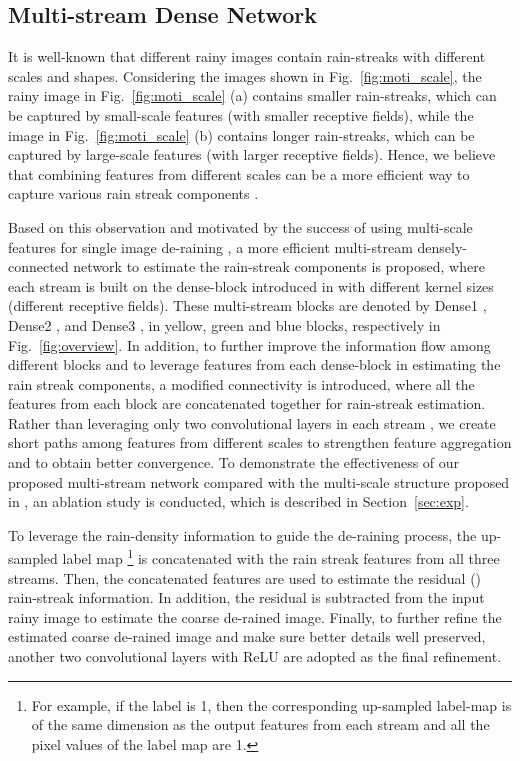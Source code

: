 \documentclass[10pt,twocolumn,letterpaper]{article}
\begin{document}
\subsection{Multi-stream Dense Network}
It is well-known that different rainy images contain rain-streaks with different scales and shapes.   Considering the images shown in Fig.~\ref{fig:moti_scale},    the rainy image in Fig.~\ref{fig:moti_scale} (a) contains smaller rain-streaks, which can be captured by small-scale features (with smaller receptive fields), while the image in Fig.~\ref{fig:moti_scale} (b) contains longer rain-streaks, which can be captured by large-scale features (with larger receptive fields).  Hence, we believe that  combining features from different scales can be a more efficient way to capture various rain streak components \cite{derain_context,derain_cvpr2017_multi}.

Based on this observation and motivated by the success of using multi-scale features for single image de-raining \cite{derain_cvpr2017_multi},  a more efficient multi-stream  densely-connected network to estimate the rain-streak components is proposed, where each stream is built on the dense-block introduced in \cite{dense_net} with different kernel sizes (different receptive fields).   These multi-stream blocks are denoted by Dense1 , Dense2 , and Dense3 , in yellow, green and blue blocks, respectively in Fig.~\ref{fig:overview}.   In addition, to further improve the information flow among different blocks and to leverage features from each dense-block in estimating the rain streak components,  a modified connectivity is introduced, where all the features from each block are concatenated together for rain-streak estimation. Rather than leveraging only two convolutional layers in each stream \cite{derain_cvpr2017_multi}, we create short paths among features from different scales to strengthen feature aggregation and to obtain better convergence. To demonstrate the effectiveness of  our proposed  multi-stream network compared with the multi-scale structure proposed in \cite{derain_cvpr2017_multi},  an ablation study is conducted, which is described in Section~\ref{sec:exp}. 

To leverage the rain-density information to guide the de-raining process,  the up-sampled label map \footnote{For example, if the label is 1, then the corresponding up-sampled label-map is of the same dimension as the output features from each stream and all the pixel values of  the label map are 1.} is concatenated with the rain streak features from all three streams. Then, the concatenated features are used to estimate the residual () rain-streak information. In addition, the residual is subtracted from the input rainy image to estimate the coarse de-rained image. Finally, to further refine the estimated coarse de-rained image and make sure better details well preserved, another two convolutional layers with ReLU are adopted as the final refinement.   
\end{document}
